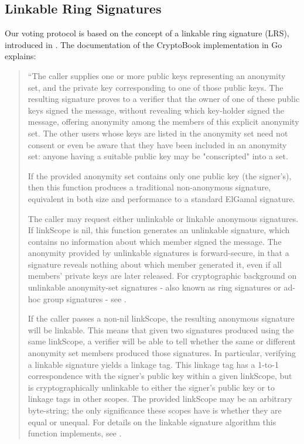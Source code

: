 \subsection{Linkable Ring Signatures}
Our voting protocol is based on the concept of a linkable ring signature (LRS),
introduced in \cite{lrs}. The documentation of the CryptoBook implementation in
Go explains:
\begin{quote}
 ``The caller supplies one or more public keys representing an anonymity set, and
 the private key corresponding to one of those public keys. The resulting
 signature proves to a verifier that the owner of one of these public keys
 signed the message, without revealing which key-holder signed the message,
 offering anonymity among the members of this explicit anonymity set. The other
 users whose keys are listed in the anonymity set need not consent or even be
 aware that they have been included in an anonymity set: anyone having a
 suitable public key may be "conscripted" into a set.

If the provided anonymity set contains only one public key (the signer's), then
this function produces a traditional non-anonymous signature, equivalent in both
size and performance to a standard ElGamal signature.

The caller may request either unlinkable or linkable anonymous signatures. If
linkScope is nil, this function generates an unlinkable signature, which
contains no information about which member signed the message. The anonymity
provided by unlinkable signatures is forward-secure, in that a signature reveals
nothing about which member generated it, even if all members' private keys are
later released. For cryptographic background on unlinkable anonymity-set
signatures - also known as ring signatures or ad-hoc group signatures - see
\cite{rs}.

If the caller passes a non-nil linkScope, the resulting anonymous signature will
be linkable. This means that given two signatures produced using the same
linkScope, a verifier will be able to tell whether the same or different
anonymity set members produced those signatures. In particular, verifying a
linkable signature yields a linkage tag. This linkage tag has a 1-to-1
correspondence with the signer's public key within a given linkScope, but is
cryptographically unlinkable to either the signer's public key or to linkage
tags in other scopes. The provided linkScope may be an arbitrary byte-string;
the only significance these scopes have is whether they are equal or unequal.
For details on the linkable signature algorithm this function implements, see
\cite{lrs}.


\end{quote}
